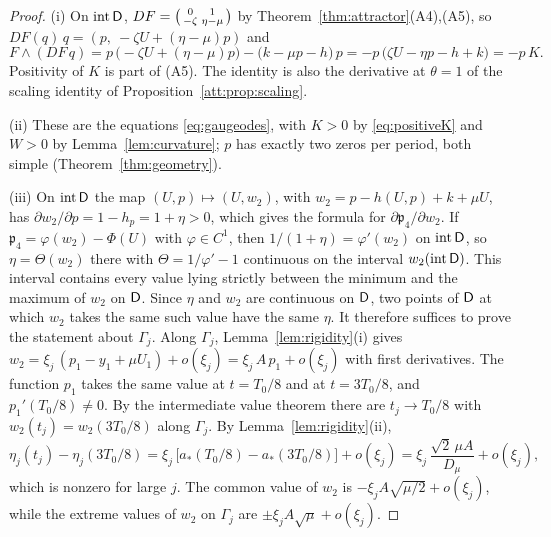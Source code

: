 \begin{proof}
(i) On $\operatorname{int}\mathsf D$, $DF=\begin{psmallmatrix}0&1\\-\zeta&\eta-\mu\end{psmallmatrix}$ by Theorem~\ref{thm:attractor}(A4),(A5), so $DF(q)\,q=(p,\ -\zeta U+(\eta-\mu)p)$ and
\[
F\wedge(DF\,q)=p\,\bigl(-\zeta U+(\eta-\mu)p\bigr)-\bigl(k-\mu p-h\bigr)\,p=-p\,\bigl(\zeta U-\eta p-h+k\bigr)=-p\,K .
\]
Positivity of $K$ is part of (A5). The identity is also the derivative at $\theta=1$ of the scaling identity of Proposition~\ref{att:prop:scaling}.

(ii) These are the equations \eqref{eq:gaugeodes}, with $K>0$ by \eqref{eq:positiveK} and $W>0$ by Lemma~\ref{lem:curvature}; $p$ has exactly two zeros per period, both simple (Theorem~\ref{thm:geometry}).

(iii) On $\operatorname{int}\mathsf D$ the map $(U,p)\mapsto(U,w_2)$, with $w_2=p-h(U,p)+k+\mu U$, has $\partial w_2/\partial p=1-h_p=1+\eta>0$, which gives the formula for $\partial\mathfrak p_4/\partial w_2$. If $\mathfrak p_4=\varphi(w_2)-\Phi(U)$ with $\varphi\in C^1$, then $1/(1+\eta)=\varphi'(w_2)$ on $\operatorname{int}\mathsf D$, so $\eta=\Theta(w_2)$ there with $\Theta=1/\varphi'-1$ continuous on the interval $w_2(\operatorname{int}\mathsf D)$. This interval contains every value lying strictly between the minimum and the maximum of $w_2$ on $\mathsf D$. Since $\eta$ and $w_2$ are continuous on $\mathsf D$, two points of $\mathsf D$ at which $w_2$ takes the same such value have the same $\eta$. It therefore suffices to prove the statement about $\Gamma_j$. Along $\Gamma_j$, Lemma~\ref{lem:rigidity}(i) gives $w_2=\xi_j\,(p_1-y_1+\mu U_1)+o(\xi_j)=\xi_j\,A\,p_1+o(\xi_j)$ with first derivatives. The function $p_1$ takes the same value at $t=T_0/8$ and at $t=3T_0/8$, and $p_1'(T_0/8)\ne0$. By the intermediate value theorem there are $t_j\to T_0/8$ with $w_2(t_j)=w_2(3T_0/8)$ along $\Gamma_j$. By Lemma~\ref{lem:rigidity}(ii),
\[
\eta_j(t_j)-\eta_j(3T_0/8)=\xi_j\,\bigl[a_*(T_0/8)-a_*(3T_0/8)\bigr]+o(\xi_j)=\xi_j\,\frac{\sqrt2\,\mu A}{D_\mu}+o(\xi_j),
\]
which is nonzero for large $j$. The common value of $w_2$ is $-\xi_jA\sqrt{\mu/2}+o(\xi_j)$, while the extreme values of $w_2$ on $\Gamma_j$ are $\pm\xi_jA\sqrt\mu+o(\xi_j)$.
\end{proof}

